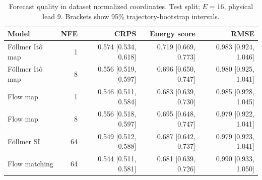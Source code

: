 \begin{table}[t]
\centering
\small
\setlength{\tabcolsep}{3pt}
\caption{Forecast quality in dataset normalized coordinates. Test split; $E=16$, physical lead 9. Brackets show 95\% trajectory-bootstrap intervals.}
\label{tab:map-quality}
\begin{tabular}{lrrrr}
\toprule
Model & NFE & CRPS & Energy score & RMSE \\
\midrule
Föllmer Itô map & 1 & 0.574 [0.534, 0.618] & 0.719 [0.669, 0.773] & 0.983 [0.924, 1.046] \\
Föllmer Itô map & 8 & 0.556 [0.519, 0.597] & 0.696 [0.650, 0.747] & 0.980 [0.925, 1.041] \\
\addlinespace
Flow map & 1 & 0.546 [0.511, 0.584] & 0.683 [0.639, 0.730] & 0.985 [0.928, 1.045] \\
Flow map & 8 & 0.556 [0.518, 0.597] & 0.695 [0.648, 0.747] & 0.979 [0.922, 1.041] \\
\addlinespace
Föllmer SI & 64 & 0.549 [0.512, 0.588] & 0.687 [0.642, 0.737] & 0.979 [0.923, 1.041] \\
\addlinespace
Flow matching & 64 & 0.544 [0.511, 0.581] & 0.681 [0.639, 0.726] & 0.990 [0.933, 1.050] \\
\bottomrule
\end{tabular}
\end{table}
